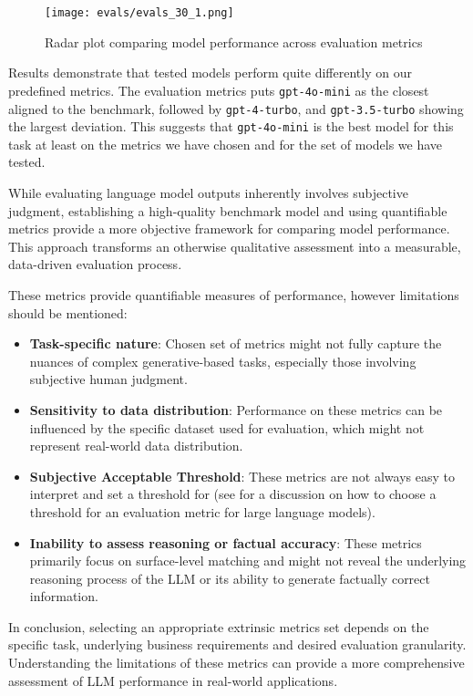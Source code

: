 \begin{figure}[h]
\centering
\texttt{[image: evals/evals\_30\_1.png]}
\caption{Radar plot comparing model performance across evaluation metrics}
\label{fig:model_comparison}
\end{figure}

Results demonstrate that tested models perform quite differently on our predefined metrics. The evaluation metrics puts \texttt{gpt-4o-mini} as the closest aligned to the benchmark, followed by \texttt{gpt-4-turbo}, and \texttt{gpt-3.5-turbo} showing the largest deviation. This suggests that \texttt{gpt-4o-mini} is the best model for this task at least on the metrics we have chosen and for the set of models we have tested.

While evaluating language model outputs inherently involves subjective judgment, establishing a high-quality benchmark model and using quantifiable metrics provide a more objective framework for comparing model performance. This approach transforms an otherwise qualitative assessment into a measurable, data-driven evaluation process.

These metrics provide quantifiable measures of performance, however limitations should be mentioned:

\begin{itemize}
    \item \textbf{Task-specific nature}: Chosen set of metrics might not fully capture the nuances of complex generative-based tasks, especially those involving subjective human judgment.
    \item \textbf{Sensitivity to data distribution}: Performance on these metrics can be influenced by the specific dataset used for evaluation, which might not represent real-world data distribution.
    \item \textbf{Subjective Acceptable Threshold}: These metrics are not always easy to interpret and set a threshold for (see  for a discussion on how to choose a threshold for an evaluation metric for large language models).
    \item \textbf{Inability to assess reasoning or factual accuracy}: These metrics primarily focus on surface-level matching and might not reveal the underlying reasoning process of the LLM or its ability to generate factually correct information.
\end{itemize}

In conclusion, selecting an appropriate extrinsic metrics set depends on the specific task, underlying business requirements and desired evaluation granularity. Understanding the limitations of these metrics can provide a more comprehensive assessment of LLM performance in real-world applications.

